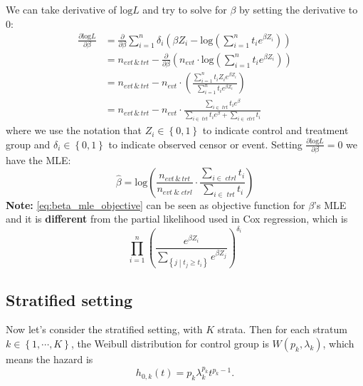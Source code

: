 \documentclass[a4paper,12pt]{article}
\begin{document}
We can take derivative of $\mathrm{log}L$ and try to solve for $\beta$ by setting the derivative to 0:
\[
  \begin{aligned}
    \frac{\partial \mathrm{log}L}{\partial \beta}
    &= \frac{\partial}{\partial\beta}
      \sum\limits_{i = 1}^n\delta_i\left(
      \beta Z_i - \mathrm{log}\left(\sum\limits_{i = 1}^nt_ie^{\beta Z_i}\right)
      \right)    \\
    &= n_{evt \,\&\, trt}
      - \frac{\partial}{\partial\beta}
      \left(n_{evt} \cdot
      \mathrm{log}\left(\sum\limits_{i = 1}^nt_ie^{\beta Z_i}\right)
      \right)    \\
    &= n_{evt\,\&\,trt}
      - n_{evt}\cdot \left(
      \frac{\sum\limits_{i = 1}^nt_iZ_ie^{\beta Z_i}}{\sum\limits_{i = 1}^nt_ie^{\beta Z_i}}
      \right)    \\
    &= n_{evt\,\&\,trt}
      - n_{evt} \cdot
      \frac{\sum\limits_{i\in\;trt}t_ie^{\beta}}{
      \sum\limits_{i\in\;trt}t_ie^{\beta} + \sum\limits_{i\in\;ctrl}t_i}
  \end{aligned}
\]
where we use the notation that $Z_i\in\left\{0, 1\right\}$ to indicate control and treatment group and $\delta_i\in\left\{0, 1\right\}$ to indicate observed censor or event. Setting $\frac{\partial\mathrm{log}L}{\partial \beta} = 0$ we have the MLE:
\begin{equation}
  \label{eq:beta_mle_exponential}
  \hat{\beta} = \mathrm{log}\left(
    \frac{n_{evt\,\&\,trt}}{n_{evt\;\&\;ctrl}}
    \cdot
    \frac{\sum\limits_{i\in\;ctrl}t_i}{\sum\limits_{i\in\;trt}t_i}
  \right)
\end{equation}
\textbf{Note:} \eqref{eq:beta_mle_objective} can be seen as objective function for $\beta$'s MLE and it is \textbf{different} from the partial likelihood used in Cox regression, which is
\[
  \prod\limits_{i = 1}^n\left(
    \frac{e^{\beta Z_i}}{\sum\limits_{\left\{j\middle|t_j\geq t_i\right\}}e^{\beta Z_j}}
  \right)^{\delta_i}
\]



\subsection{Stratified setting}
\label{sec:stratified-setting}

Now let's consider the stratified setting, with $K$ strata. Then for each stratum $k\in\left\{1, \cdots, K\right\}$, the Weibull distribution for control group is $W\left(p_k, \lambda_k\right)$, which means the hazard is
\[
  h_{0, k}\left(t\right) = p_k\lambda_k^{p_k}t^{p_k - 1}.
\]
\end{document}
